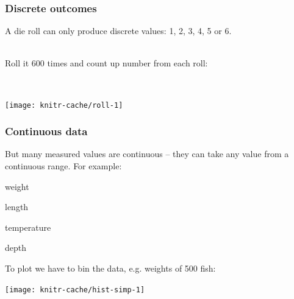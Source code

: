 \begin{frame}
\frametitle{Discrete outcomes}

A die roll can only produce \alert{discrete} values: 1, 2, 3, 4, 5 or 6.

~\\

Roll it 600 times and count up number from each roll:

~\\
\begin{knitrout}
\color{fgcolor}
\texttt{[image: knitr-cache/roll-1]}

\end{knitrout}

\end{frame}


%
%
%
%
%
%
%
%
%
%
%
%
%

\begin{frame}
\frametitle{Continuous data}


But many measured values are \alert{continuous} -- they can take any value from
a continuous range. For example:

\bi
\item weight
\item length
\item temperature
\item depth
\ei

To plot we have to bin the data, e.g. weights of 500 fish:

\begin{knitrout}
\color{fgcolor}
\texttt{[image: knitr-cache/hist-simp-1]}

\end{knitrout}




\end{frame}


